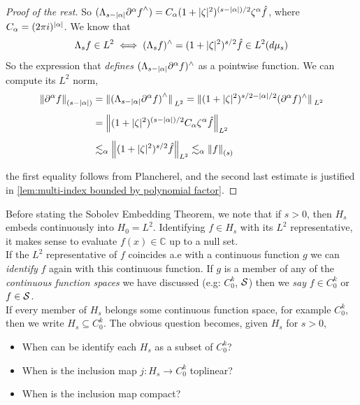 \documentclass[../main-v2-manifolds.tex]{subfiles}
\begin{document}
\begin{proof}[Proof of the rest]
So $({\Lambda_{s-\vert {\alpha} \vert}\partial^\alpha f}^{\wedge}) = C_{\alpha} (1+\vert {\zeta} \vert^2)^{(s-\vert {\alpha} \vert)/2} \zeta^\alpha \hat{f}$, where $C_\alpha = (2\pi i)^{\vert {\alpha} \vert}$. We know that 
\[
\Lambda_s f\in L^2\iff (\Lambda_s f)^{\wedge} = (1+\vert {\zeta} \vert^2)^{s/2}\hat{f}\in L^2(d\mu_s)
\]
So the expression that \emph{defines} $(\Lambda_{s-\vert {\alpha} \vert}\partial^\alpha f)^{\wedge}$ as a pointwise function. We can compute its $L^2$ norm, 
\begin{align*}
\norm{\partial^{\alpha}f}_{(s-\vert {\alpha} \vert)} &=\norm*{{(\Lambda_{s-\vert {\alpha} \vert}\partial^\alpha f)}^{\wedge}}_{L^2}= \norm*{(1+\vert {\zeta} \vert^2)^{s/2 - \vert {\alpha} \vert/2}(\partial^\alpha f)^{\wedge}}_{L^2}\\[1ex]
&= \norm{(1+\vert {\zeta} \vert^2)^{(s-\vert {\alpha} \vert)/2}C_{\alpha}\zeta^{\alpha}\hat{f}}_{L^2}\\[1ex]
&\lesssim_{\alpha}\norm{(1+\vert {\zeta} \vert^2)^{s/2}\hat{f}}_{L^2}\lesssim_{\alpha}\norm{f}_{(s)}
\end{align*}

the first equality follows from Plancherel, and the second last estimate is justified in \cref{lem:multi-index bounded by polynomial factor}.
\end{proof}





Before stating the Sobolev Embedding Theorem, we note that if $s>0$, then $H_s$ embeds continuously into $H_0 = L^2$. Identifying $f\in H_s$ with its $L^2$ representative, it makes sense to evaluate $f(x)\in\mathbb{C}$ up to a null set.\\

If the $L^2$ representative of $f$ coincides a.e with a continuous function $g$ we can \emph{identify} $f$ again with this continuous function. If $g$ is a member of any of the \emph{continuous function spaces} we have discussed (e.g: $C_0^k$, $\mathcal{S}$) then we \emph{say} $f\in C^{k}_0$ or $f\in \mathcal{S}$.\\

If every member of $H_s$ belongs some continuous function space, for example $C_0^k$, then we write $H_s\subseteq C_0^k$. The obvious question becomes, given $H_s$ for $s>0$, 
\begin{itemize}
    \item When can be identify each $H_s$ as a subset of $C_0^k$?
    \item When is the inclusion map $j: H_s\to C_0^k$ toplinear?
    \item When is the inclusion map compact?
\end{itemize}
\end{document}
